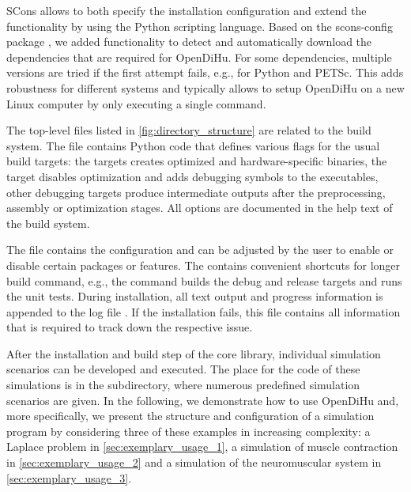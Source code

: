 SCons allows to both specify the installation configuration and extend the functionality by using the Python scripting language. Based on the scons-config package \cite{sconsconfig}, we added functionality to detect and automatically download the dependencies that are required for OpenDiHu. For some dependencies, multiple versions are tried if the first attempt fails, e.g., for Python and PETSc.
This adds robustness for different systems and typically allows to setup OpenDiHu on a new Linux computer by only executing a single  command.

The top-level files listed in \cref{fig:directory_structure} are related to the build system. The file  contains Python code that defines various flags for the usual build targets: the  targets creates optimized and hardware-specific binaries, the  target disables optimization and adds debugging symbols to the executables, other debugging targets produce intermediate outputs after the  preprocessing, assembly or optimization stages. All options are documented in the help text of the build system.

The  file contains the configuration and can be adjusted by the user to enable or disable certain packages or features. The  contains convenient shortcuts for longer build command, e.g., the command  builds the debug and release targets and runs the unit tests. During installation, all text output and progress information is appended to the log file . If the installation fails, this file contains all information that is required to track down the respective issue.

After the installation and build step of the core library, individual simulation scenarios can be developed and executed. The place for the code of these simulations is in the  subdirectory, where numerous predefined simulation scenarios are given. In the following, we demonstrate how to use OpenDiHu and, more specifically, we present the structure and configuration of a simulation program by considering three of these examples in increasing complexity: a Laplace problem in \cref{sec:exemplary_usage_1}, a simulation of muscle contraction in \cref{sec:exemplary_usage_2} and a simulation of the neuromuscular system in \cref{sec:exemplary_usage_3}.

